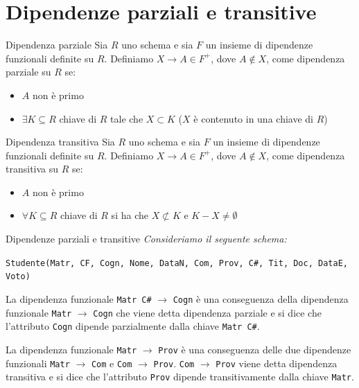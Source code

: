 \section{Dipendenze parziali e transitive}
\begin{Definition}{Dipendenza parziale}{}
    Sia $R$ uno schema e sia $F$ un insieme di dipendenze funzionali definite su $R$. Definiamo $X \to A \in F^+$, dove $A \notin X$, come dipendenza parziale su $R$ se:
    \begin{itemize}
        \item $A$ non è primo
        \item $\exists K \subseteq R$ chiave di $R$ tale che $X \subset K$ ($X$ è contenuto in una chiave di $R$)
    \end{itemize}

\end{Definition}

\begin{Definition}{Dipendenza transitiva}{}
    Sia $R$ uno schema e sia $F$ un insieme di dipendenze funzionali definite su $R$. Definiamo $X \to A \in F^+$, dove $A \notin X$, come dipendenza transitiva su $R$ se:
    \begin{itemize}
        \item $A$ non è primo
        \item $\forall K \subseteq R$ chiave di $R$ si ha che $X \not\subset K$ e $K - X \neq \emptyset$
    \end{itemize}

\end{Definition}

\begin{Example}{Dipendenze parziali e transitive}{}
    \textit{Consideriamo il seguente schema:}
    \begin{center}
        \verb|Studente(Matr, CF, Cogn, Nome, DataN, Com, Prov, C#, Tit, Doc, DataE, Voto)|
    \end{center}
    La dipendenza funzionale \verb|Matr C#| $\to$ \verb|Cogn| è una conseguenza della dipendenza funzionale \verb|Matr| $\to$ \verb|Cogn| che viene detta dipendenza parziale e si dice che l'attributo \verb|Cogn| dipende parzialmente dalla chiave \verb|Matr C#|.

    La dipendenza funzionale \verb|Matr| $\to$ \verb|Prov| è una conseguenza delle due dipendenze funzionali \verb|Matr| $\to$ \verb|Com| e \verb|Com| $\to$ \verb|Prov|. \verb|Com| $\to$ \verb|Prov| viene detta dipendenza transitiva e si dice che l'attributo \verb|Prov| dipende transitivamente dalla chiave \verb|Matr|.
\end{Example}

